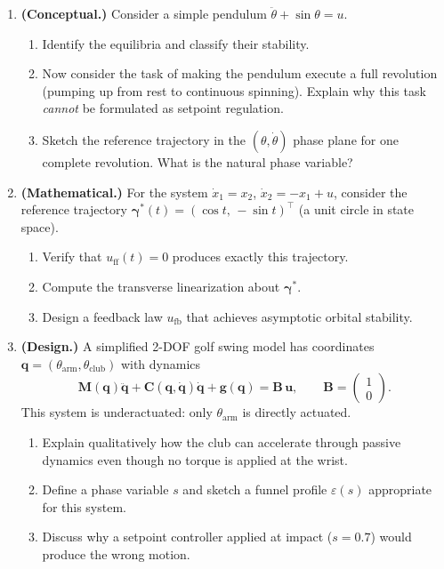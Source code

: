 \documentclass[12pt, openany]{book}
\theoremstyle{plain}
\newcommand{\control}{\bm{u}}
\newcommand{\traj}{\bm{\gamma}}
\begin{document}
\begin{enumerate}[label=\textbf{1.\arabic*.}, leftmargin=1.5cm]

\item \textbf{(Conceptual.)} Consider a simple pendulum $\ddot{\theta} + \sin\theta = u$.
  \begin{enumerate}[label=(\alph*)]
    \item Identify the equilibria and classify their stability.
    \item Now consider the task of making the pendulum execute a full revolution
          (pumping up from rest to continuous spinning). Explain why this task
          \emph{cannot} be formulated as setpoint regulation.
    \item Sketch the reference trajectory in the $(\theta, \dot{\theta})$ phase
          plane for one complete revolution. What is the natural phase variable?
  \end{enumerate}

\item \textbf{(Mathematical.)} For the system $\dot{x}_1 = x_2$,\;
  $\dot{x}_2 = -x_1 + u$, consider the reference trajectory
  $\traj^*(t) = (\cos t,\, -\sin t)^\top$ (a unit circle in state space).
  \begin{enumerate}[label=(\alph*)]
    \item Verify that $u_{\text{ff}}(t) = 0$ produces exactly this trajectory.
    \item Compute the transverse linearization about $\traj^*$.
    \item Design a feedback law $u_{\text{fb}}$ that achieves asymptotic orbital
          stability.
  \end{enumerate}

\item \textbf{(Design.)} A simplified 2-DOF golf swing model has coordinates
  $\bm{q} = (\theta_{\text{arm}}, \theta_{\text{club}})$ with dynamics
  \[
    \bm{M}(\bm{q})\ddot{\bm{q}} + \bm{C}(\bm{q}, \dot{\bm{q}})\dot{\bm{q}}
    + \bm{g}(\bm{q}) = \bm{B}\,\control,
    \qquad \bm{B} = \begin{pmatrix} 1 \\ 0 \end{pmatrix}.
  \]
  This system is underactuated: only $\theta_{\text{arm}}$ is directly actuated.
  \begin{enumerate}[label=(\alph*)]
    \item Explain qualitatively how the club can accelerate through passive dynamics
          even though no torque is applied at the wrist.
    \item Define a phase variable $s$ and sketch a funnel profile $\varepsilon(s)$
          appropriate for this system.
    \item Discuss why a setpoint controller applied at impact ($s = 0.7$) would
          produce the wrong motion.
  \end{enumerate}


\end{enumerate}
\end{document}

